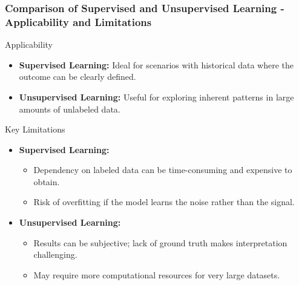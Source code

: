 \documentclass{beamer}
\begin{document}
\begin{frame}[fragile]
    \frametitle{Comparison of Supervised and Unsupervised Learning - Applicability and Limitations}
    \begin{block}{Applicability}
        \begin{itemize}
            \item \textbf{Supervised Learning:} Ideal for scenarios with historical data where the outcome can be clearly defined.
            \item \textbf{Unsupervised Learning:} Useful for exploring inherent patterns in large amounts of unlabeled data.
        \end{itemize}
    \end{block}
    
    \begin{block}{Key Limitations}
        \begin{itemize}
            \item \textbf{Supervised Learning:}
            \begin{itemize}
                \item Dependency on labeled data can be time-consuming and expensive to obtain.
                \item Risk of overfitting if the model learns the noise rather than the signal.
            \end{itemize}
            \item \textbf{Unsupervised Learning:}
            \begin{itemize}
                \item Results can be subjective; lack of ground truth makes interpretation challenging.
                \item May require more computational resources for very large datasets.
            \end{itemize}
        \end{itemize}
    \end{block}
\end{frame}
\end{document}
